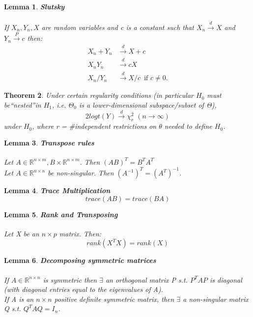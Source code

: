 \documentclass{article}
\newtheorem{lemma}{Lemma}
\newtheorem{theorem}[lemma]{Theorem}
\begin{document}
\begin{lemma} \textbf{Slutsky} \\
\\
If $X_n, Y_n, X$ are random variables and c is a constant such that $X_n \overset{d}{\to} X $  and $Y_n \overset{P}{\to} c$ then:
\begin{align*}
     X_n + Y_n &\overset{d}{\to} X + c \\ X_nY_n &\overset{d}{\to} cX \\ X_n/Y_n &\overset{d}{\to} X/c \hspace{6pt}\text{if }  c  \ne 0.
\end{align*}
\end{lemma}

\begin{theorem}
Under certain regularity conditions (in particular $H_0$ must be“nested”in $H_1$, i.e. $Θ_0$ is
a lower-dimensional subspace/subset of Θ),
$$2log t(Y) \overset{d}{\to} \chi^2_r \hspace{4pt} (n \to \infty)$$
under $H_0$, where r = #independent restrictions on $\theta$ needed to define $H_0$.
\end{theorem}
\begin{lemma} \textbf{Transpose rules} \\
\\
Let $A \in \mathbb{R}^{n \times m},B \times \mathbb{R}^{n \times m}$. Then $(AB)^T = B^TA^T$ \\ Let $A \in \mathbb{R}^{n \times n}$ be non-singular. Then $(A^{-1})^T = (A^T )^{-1}$.
\end{lemma}

\begin{lemma} \textbf{Trace Multiplication} \\
$$
trace(AB) = trace(BA)
$$
\end{lemma}

\begin{lemma} \textbf{Rank and Transposing} \\
\\
Let X be an $n \times p$ matrix. Then: $$rank(X^T X ) = rank(X)$$
\end{lemma}

\begin{lemma} \textbf{Decomposing symmetric matrices} \\
\\
If $A \in \mathbb{R}^{n \times n}$ is symmetric then $\exists$ an orthogonal matrix P s.t. $P^TAP$ is diagonal (with diagonal entries equal to the eigenvalues of A). \\
If A is an $n \times n$ positive definite symmetric matrix, then $\exists$ a non-singular matrix Q s.t. $Q^TAQ = I_n$.
\end{lemma}
\end{document}
